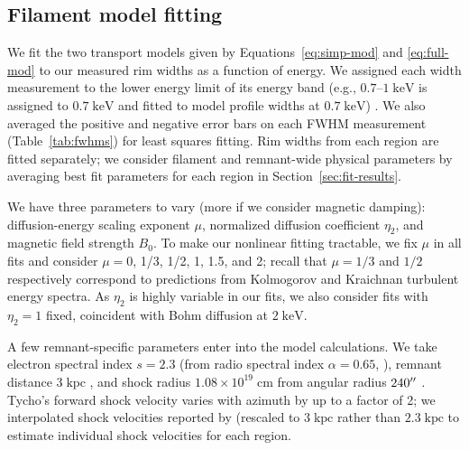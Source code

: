 \documentclass[iop, apj, numberedappendix, twocolappendix]{emulateapj}
\newcommand*{\mt}{\mathrm}
\newcommand*{\unit}[1]{\;\mt{#1}}  %
\begin{document}
\subsection{Filament model fitting}
\label{sec:fits}

We fit the two transport models given by Equations~\eqref{eq:simp-mod} and
\eqref{eq:full-mod} to our measured rim widths as a function of energy.
We assigned each width measurement to the lower energy limit of its energy band
(e.g., $0.7$--$1 \unit{keV}$ is assigned to $0.7 \unit{keV}$ and fitted to
model profile widths at $0.7 \unit{keV}$) .
We also averaged the positive and negative error bars on each FWHM measurement
(Table~\ref{tab:fwhms}) for least squares fitting.
Rim widths from each region are fitted separately; we consider filament and
remnant-wide physical parameters by averaging best fit parameters for each
region in Section~\ref{sec:fit-results}.

We have three parameters to vary (more if we consider magnetic damping):
diffusion-energy scaling exponent $\mu$, normalized diffusion
coefficient $\eta_2$, and magnetic field strength $B_0$.
To make our nonlinear fitting tractable, we fix $\mu$ in all fits and
consider $\mu = 0$, 1/3, 1/2, 1, 1.5, and 2; recall that $\mu = 1/3$ and $1/2$
respectively correspond to predictions from Kolmogorov and Kraichnan turbulent
energy spectra.  As $\eta_2$ is highly variable in our fits, we also consider
fits with $\eta_2 = 1$ fixed, coincident with Bohm diffusion at $2 \unit{keV}$.

A few remnant-specific parameters enter into the model calculations.  We take
electron spectral index $s = 2.3$ (from radio spectral index $\alpha = 0.65$,
\citet{kothes2006} ),
remnant distance $3 \unit{kpc}$ \citep[cf.][]{hayato2010}, and
shock radius $1.08 \times 10^{19} \unit{cm}$ from angular radius $240\mbox{$^{\prime\prime}$}$
\citep{green2009}.  Tycho's forward shock velocity varies with azimuth by up to
a factor of 2; we interpolated shock velocities reported by
\citet{williams2013} (rescaled to $3 \unit{kpc}$ rather than $2.3 \unit{kpc}$
to estimate individual shock velocities for each region.
\end{document}
